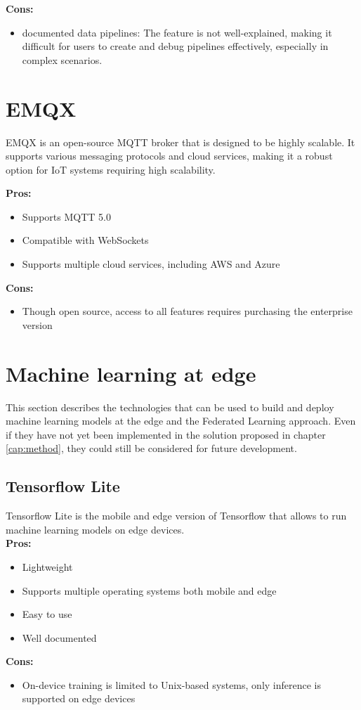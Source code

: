 \textbf{Cons:}
\begin{itemize}
    \item \Poorly documented data pipelines: The feature is not well-explained, making it difficult for users to create and debug pipelines effectively, especially in complex scenarios.
\end{itemize}


\section{EMQX}
\label{emqx}
EMQX\cite{site:emqx} is an open-source MQTT broker that is designed to be highly scalable. It supports various messaging protocols and cloud services, making it a robust option for IoT systems requiring high scalability.

\textbf{Pros:}
\begin{itemize}
    \item Supports MQTT 5.0
    \item Compatible with WebSockets
    \item Supports multiple cloud services, including AWS and Azure
\end{itemize}

\textbf{Cons:}
\begin{itemize}
    \item Though open source, access to all features requires purchasing the enterprise version
\end{itemize}

\section{Machine learning at edge} 
This section describes the technologies that can be used to build and deploy machine learning models at the edge and the Federated Learning approach. Even if they have not yet been implemented in the solution proposed in chapter \ref{cap:method}, they could still be considered for future development.

\subsection*{Tensorflow Lite}
\label{tensorflow-lite}
Tensorflow Lite\cite{site:tflite} is the mobile and edge version of Tensorflow\cite{site:tensorflow} that allows to run machine learning models on edge devices.\\
\textbf{Pros:}
\begin{itemize}
    \item Lightweight
    \item Supports multiple operating systems both mobile and edge
    \item Easy to use
    \item Well documented
\end{itemize}
\textbf{Cons:}
\begin{itemize}
    \item On-device training is limited to Unix-based systems, only inference is supported on edge devices
\end{itemize}

